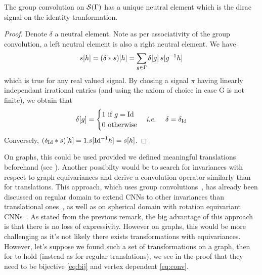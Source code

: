 \begin{proposition} The group convolution on $\cs(\Gamma)$ has a unique neutral element which is the dirac signal on the identity tranformation.
\end{proposition}
\begin{proof}
Denote $\delta$ a neutral element. Note as per associativity of the group convolution, a left neutral element is also a right neutral element. We have $$s[h] = (\delta \ast s)[h] = \displaystyle \sum_{g \in \Gamma} \delta[g] \h{2} s[g^{-1}h]$$ which is true for any real valued signal. By chosing a signal $\pi$ having linearly independant irrational entries (and using the axiom of choice in case G is not finite), we obtain that $$\delta[g] = \begin{cases} 1 \text{ if } g = \id\\ 0 \text{ otherwise}\end{cases} \ie \quad \delta = \delta_{\id}$$
Conversely, $(\delta_{\id} \ast s)[h] = 1 . s[{\id}^{-1}h] = s[h]$.
\end{proof}












On graphs, this could be used provided we defined meaningful translations beforehand (see \secref{}). Another possibilty would be to search for invariances with respect to graph equivariances and derive a convolution operator similarly than for translations. This approach, which uses group convolutions~\citep{weinstein1996groupoids}, has already been discussed on regular domain to extend CNNs to other invariances than translational ones~\citep{cohen2016group,hoogeboom2018hexaconv}, as well as on spherical domain with rotation equivariant CNNs~\citep{cohen2018spherical}. As stated from the previous remark, the big advantage of this approach is that there is no loss of expressivity. However on graphs, this would be more challenging as it's not likely there exists transformations with equivariances. However, let's suppose we found such a set of transformations on a graph, then for  to hold (instead as for regular translations), we see in the proof that they need to be bijective \eqref{eq:bij} and vertex dependent \ref{eq:conv}.




